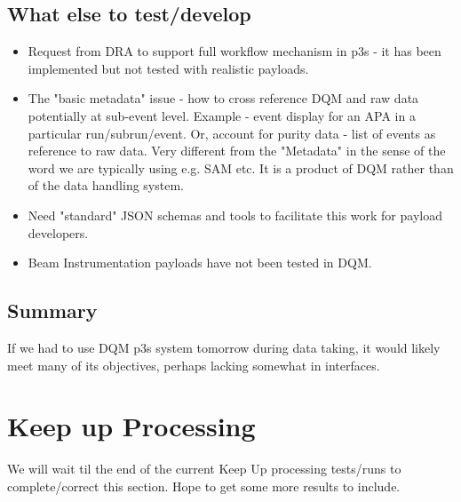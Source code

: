 \documentclass[pdftex,12pt,letter]{article}
\begin{document}
 
\subsection{What else to test/develop}

\begin{itemize}
\item Request from DRA to support full workflow mechanism in p3s - it has been implemented but not tested with realistic payloads.
\item The "basic metadata" issue - how to cross reference DQM and raw data potentially at sub-event level. Example - event display for an APA in a particular run/subrun/event. Or, account for purity data - list of events as reference to raw data.
Very different from the "Metadata" in the sense of the word we are typically using e.g. SAM etc. It is a product of DQM rather than of the data handling system.
\item Need "standard" JSON schemas and tools to facilitate this work for payload developers.
\item Beam Instrumentation payloads have not been tested in DQM.
\end{itemize}

\subsection{Summary}
If we had to use DQM p3s system tomorrow during data taking, it would likely meet many of its objectives, perhaps lacking somewhat in interfaces.
 
 

\section {Keep up Processing}

 \color{red} We will wait til the end of the current Keep Up processing tests/runs to complete/correct this section. Hope to get some more results to include.
 \color{black}
\end{document}

